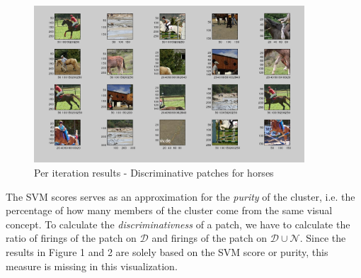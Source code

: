 \begin{figure}[h!]
\centering
\includegraphics[width=0.9\textwidth]{figures/horses.png}
\caption{Per iteration results - Discriminative patches for horses}
\end{figure}

The SVM scores serves as an approximation for the \textit{purity} of the cluster, i.e. the percentage of
how many members of the cluster come from the same visual concept. To calculate the \textit{discriminativness}
of a patch, we have to calculate the ratio of firings of the patch on $\mathcal{D}$ and firings of the patch on $\mathcal{D} \cup \mathcal{N}$.
Since the results in Figure 1 and 2 are solely based on the SVM score or purity, this measure is missing in this visualization.